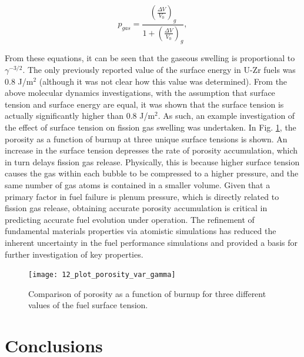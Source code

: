 \documentclass[review]{elsarticle}
\begin{document}
\begin{equation}
  p_{gas} = \frac{\left(\frac{\Delta V}{V_0}\right)_{g}}{1 + \left(\frac{\Delta V}{V_0}\right)_{g}},
\end{equation}

From these equations, it can be seen that the gaseous swelling is proportional to $\gamma^{-3/2}$. The only previously reported value of the surface energy in U-Zr fuels was 0.8 J/m$^2$ \cite{tsuboi1992} (although it was not clear how this value was determined). From the above molecular dynamics investigations, with the assumption that surface tension and surface energy are equal, it was shown that the surface tension is actually significantly higher than 0.8 J/m$^2$. As such, an example investigation of the effect of surface tension on fission gas swelling was undertaken. In Fig. \ref{fig:plot_porosity_var_gamma}, the porosity as a function of burnup at three unique surface tensions is shown. An increase in the surface tension depresses the rate of porosity accumulation, which in turn delays fission gas release. Physically, this is because higher surface tension causes the gas within each bubble to be compressed to a higher pressure, and the same number of gas atoms is contained in a smaller volume. Given that a primary factor in fuel failure is plenum pressure, which is directly related to fission gas release, obtaining accurate porosity accumulation is critical in predicting accurate fuel evolution under operation. The refinement of fundamental materials properties via atomistic simulations has reduced the inherent uncertainty in the fuel performance simulations and provided a basis for further investigation of key properties. 

\begin{figure}[!htp]
\begin{center}
\texttt{[image: 12\_plot\_porosity\_var\_gamma]}
\end{center}
\caption{Comparison of porosity as a function of burnup for three different values of the fuel surface tension.}
\label{fig:plot_porosity_var_gamma}
\end{figure}

\FloatBarrier

\section{Conclusions}
\end{document}
